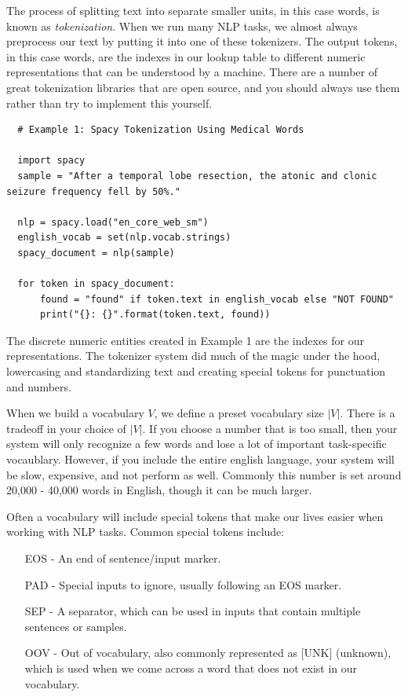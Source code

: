 The process of splitting text into separate smaller units, in this case words, is known as \textit{tokenization}. When we run many NLP tasks, we almost always preprocess our text by putting it into one of these tokenizers. The output tokens,
in this case words, are the indexes in our lookup table to different numeric representations that can be understood by a machine. There are a number of great tokenization libraries that are open source, and you should always use them rather than
try to implement this yourself.


\begin{verbatim}
  # Example 1: Spacy Tokenization Using Medical Words

  import spacy
  sample = "After a temporal lobe resection, the atonic and clonic seizure frequency fell by 50%."

  nlp = spacy.load("en_core_web_sm")
  english_vocab = set(nlp.vocab.strings)
  spacy_document = nlp(sample)

  for token in spacy_document:
      found = "found" if token.text in english_vocab else "NOT FOUND"
      print("{}: {}".format(token.text, found))

\end{verbatim}

The discrete numeric entities created in Example 1 are the indexes for our representations. The tokenizer system did much of the magic under the hood, lowercasing and standardizing text and creating special tokens for punctuation and numbers.

When we build a vocabulary $V$, we define a preset vocabulary size $|V|$. There is a tradeoff in your choice of $|V|$. If you choose a number that is too small, then
your system will only recognize a few words and lose a lot of important task-specific vocaublary. However, if you include the entire english language, your system will be slow, expensive, and not perform as well.
Commonly this number is set around 20,000 - 40,000 words in English, though it can be much larger.

Often a vocabulary will include special tokens that make our lives easier when working with NLP tasks. Common special tokens include:
\begin{itemize}
  \item [EOS] - An end of sentence/input marker.
  \item [PAD] - Special inputs to ignore, usually following an EOS marker.
  \item [SEP] - A separator, which can be used in inputs that contain multiple sentences or samples.
  \item [OOV] - Out of vocabulary, also commonly represented as [UNK] (unknown), which is used when we come across a word that does not exist in our vocabulary.
\end{itemize}

